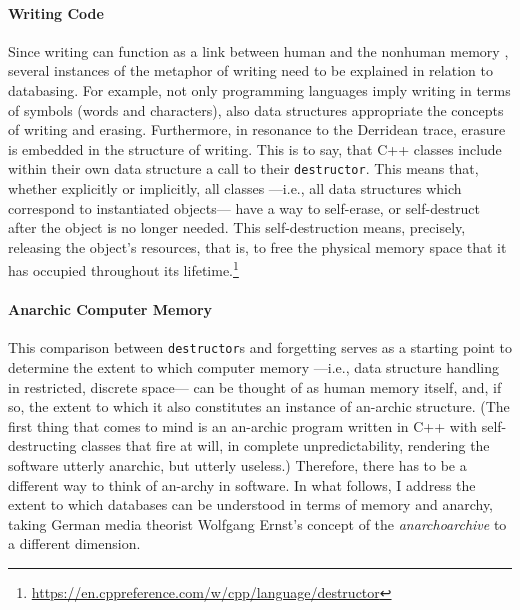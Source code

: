 \paragraph{Writing Code}
Since writing can function as a link between human and the nonhuman memory , several instances of the metaphor of writing need to be explained in relation to databasing. For example, not only programming languages imply writing in terms of symbols (words and characters), also data structures appropriate the concepts of writing and erasing. Furthermore, in resonance to the Derridean trace, erasure is embedded in the structure of writing. This is to say, that C++ classes include within their own data structure a call to their \texttt{destructor}. This means that, whether explicitly or implicitly, all classes ---i.e., all data structures which correspond to instantiated objects--- have a way to self-erase, or self-destruct after the object is no longer needed. This self-destruction means, precisely, releasing the object's resources, that is, to free the physical memory space that it has occupied throughout its lifetime.\footnote{\url{https://en.cppreference.com/w/cpp/language/destructor}}

\paragraph{Anarchic Computer Memory}
This comparison between \texttt{destructor}s and forgetting serves as a starting point to determine the extent to which computer memory ---i.e., data structure handling in restricted, discrete space--- can be thought of as human memory itself, and, if so, the extent to which it also constitutes an instance of an-archic structure. (The first thing that comes to mind is an an-archic program written in C++ with self-destructing classes that fire at will, in complete unpredictability, rendering the software utterly anarchic, but utterly useless.) Therefore, there has to be a different way to think of an-archy in software. In what follows, I address the extent to which databases can be understood in terms of memory and anarchy, taking German media theorist Wolfgang Ernst's concept of the \textit{anarchoarchive} to a different dimension.

